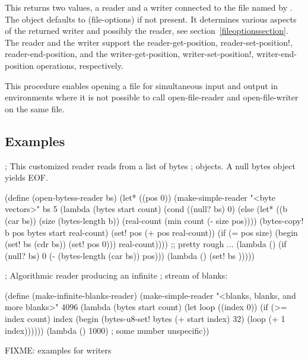 \begin{entry}{%
}
   
This returns two values, a reader and a writer connected to the file
named by . The  object defaults to
{\cf (file-options)} if not present. It determines various aspects of
the returned writer and possibly the reader, see
section~\ref{fileoptionssection}. The reader and the writer support
the {\cf reader-get-position}, {\cf reader-set-position!}, {\cf
  reader-end-position}, and the {\cf writer-get-position}, {\cf
  writer-set-position!}, {\cf writer-end-position} operations,
respectively.

\begin{note}
  This procedure enables opening a file for simultaneous input and
  output in environments where it is not possible to call
  open-file-reader and open-file-writer on the same file.
\end{note}     
\end{entry}

\subsection{Examples}

\begin{schemenoindent}
; This customized reader reads from a list of bytes
; objects. A null bytes object yields EOF.

(define (open-bytess-reader bs)
  (let* ((pos 0))
    (make-simple-reader
     "<byte vectors>"
     bs
     5
     (lambda (bytes start count)
       (cond
        ((null? bs)
         0)
        (else
         (let* ((b (car bs))
                (size (bytes-length b))
                (real-count (min count (- size pos))))
           (bytes-copy! b pos
                           bytes start
                           real-count)
           (set! pos (+ pos real-count))
           (if (= pos size)
               (begin
                 (set! bs (cdr bs))
                 (set! pos 0)))
           real-count))))
     ;; pretty rough ...
     (lambda ()
       (if (null? bs)
           0
           (- (bytes-length (car bs)) pos)))
     \schfalse{} \schfalse{} \schfalse{}
     (lambda ()
       (set! bs \schfalse{})))))

; Algorithmic reader producing an infinite
; stream of blanks:

(define (make-infinite-blanks-reader)
  (make-simple-reader
    "<blanks, blanks, and more blanks>"
    \schfalse{}
    4096
    (lambda (bytes start count)
      (let loop ((index 0))
        (if (>= index count)
            index
            (begin
              (bytes-u8-set! bytes (+ start index) 32)
              (loop (+ 1 index))))))
    (lambda ()
      1000) ; some number
    \schfalse{} \schfalse{} \schfalse{}
    unspecific))

FIXME: examples for writers
\end{schemenoindent}
                    

